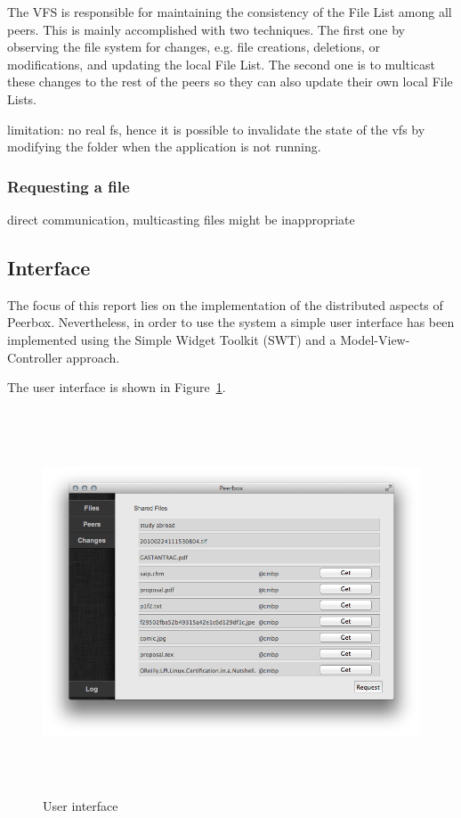 The VFS is responsible for maintaining the consistency of the File List among all peers. This is mainly accomplished with two techniques. The first one by observing the file system for changes, e.g. file creations, deletions, or modifications, and updating the local File List. The second one is to multicast these changes to the rest of the peers so they can also update their own local File Lists.



limitation: no real fs, hence it is possible to invalidate the state of the vfs by modifying the folder when the application is not running. 

\subsubsection{Requesting a file}
direct communication, multicasting files might be inappropriate


\subsection{Interface}
The focus of this report lies on the implementation of the distributed aspects of Peerbox. Nevertheless, in order to use the system a simple user interface has been implemented using the Simple Widget Toolkit (SWT) and a Model-View-Controller approach. 

The user interface is shown in Figure~\ref{fig:figures_gui}.

\begin{figure}[htbp]
    \centering
        \includegraphics[height=4.5in]{figures/gui.png}
    \caption{User interface}
    \label{fig:figures_gui}
\end{figure}
